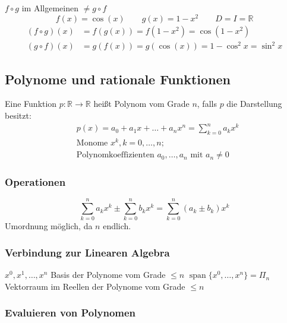 \begin{note} \(f \circ g \) im Allgemeinen \( \neq g \circ f \)
	\[
			f(x) = \cos(x)\qquad g(x) = 1-x^2 \qquad D = I=\mathbb{R}
	\]
		\begin{align*}
		(f \circ g)(x) &= f(g(x)) = f(1-x^2) = \cos(1-x^2) \\
		(g \circ f)(x) &= g(f(x)) = g(\cos(x)) = 1-\cos^2x = \sin^2x
	\end{align*}
\end{note}


\subsection{Polynome und rationale Funktionen} %
\label{sub:polyFunk}

Eine Funktion \( p:\mathbb{R} \rightarrow \mathbb{R} \) heißt Polynom vom Grade $n$, falls $p$ die Darstellung besitzt:
\begin{align*}
	&p(x)=a_0+a_1x+\ldots+a_n x^n = \sum_{k=0}^{n} a_kx^k\\
	&\text{Monome }x^k, k=0,\ldots,n; \\
	&\text{Polynomkoeffizienten }a_0,\ldots,a_n \text{ mit } a_n \neq 0
\end{align*}

\subsubsection*{Operationen} %
\label{ssub:polyOp}

\[
  \sum_{k=0}^{n}  a_kx^k  \pm
  \sum_{k=0}^{n}  b_kx^k  =
  \sum_{k=0}^{n}  (a_k \pm b_k)x^k
\]
Umordnung möglich, da \( n \) endlich.

\subsubsection*{Verbindung zur Linearen Algebra} %
\label{ssub:polyLinAlg}
\( x^0,x^1,\ldots,x^n \) Basis der Polynome vom Grade \( \leq n \) \newline
\( \operatorname{span} \{x^0 ,\ldots,x^n\}=\Pi_n \) Vektorraum im Reellen der Polynome vom Grade \( \leq n \)


\subsubsection*{Evaluieren von Polynomen} %
\label{ssub:evaluieren_von_polynomen}

